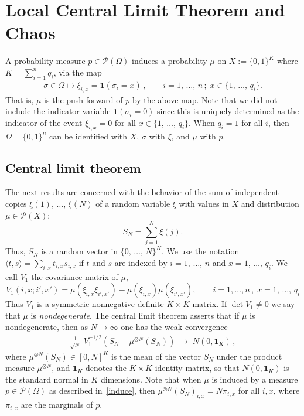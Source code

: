 \documentclass[AHL,Unicode,longabstracts,published]{cedram}
\newcommand{\si}{\sigma}
\newcommand{\scalar}[2]{\langle #1, #2\rangle}
\newcommand{\ind}{\mathbf{1}}
\newcommand{\cP}{\mathcal{P}}
\let\O=\Omega
\begin{document}
\section{Local Central Limit Theorem and Chaos}\label{sec:clt_chaos}

A probability measure $p\in\cP(\O)$ induces a probability $\mu$ on $X:=\{0,1\}^K$ where $K=\sum_{i=1}^n q_{i}$, via the map
\begin{align}\label{induce}
\si\in\O \mapsto \xi_{i,x} = \ind(\si_i=x)\,,\qquad i=1,\,\dots,\,n\,;\; x\in \{1,\,\dots,\,q_i\}.
\end{align}
That is, $\mu$ is the push forward of $p$ by the above map. Note that we did not include the indicator variable $ \ind(\si_i=0)$ since this is uniquely determined as the indicator of the event $\xi_{i,x}=0$ for all $x\in \{1,\,\dots,\,q_i\}$. When $q_i=1$ for all $i$, then $\O=\{0,1\}^n$ can be identified with $X$, $\si$ with $\xi$, and $\mu$ with $p$.


\subsection{Central limit theorem}

The next results are concerned with the behavior of the sum of independent copies $\xi(1),\,\dots,\,\xi(N)$ of a random variable $\xi$ with values in $X$ and distribution $\mu\in\cP(X)$:
\[
S_N = \sum_{j=1}^N\xi(j).
\]
Thus, $S_N$ is a random vector in $\{0,\,\dots,\,N\}^K$. We use the notation $\scalar{t}{s}=\sum_{i,x}t_{i,x}s_{i,x}$ if $t$ and $s$ are indexed by $i=1,\,\dots,\,n$ and $x=1,\,\dots,\,q_i$. We call $V_1$ the covariance matrix of $\mu$,
\[
V_1(i,x;i',x')=\mu(\xi_{i,x}\xi_{i',x'})-\mu(\xi_{i,x})\mu(\xi_{i',x'}),\qquad i=1,\dots,n\,,\; x=1,\,\dots,\,q_i
\]
Thus $V_1$ is a symmetric nonnegative definite $K\times K$ matrix. If $\det V_1\neq 0$ we say that $\mu$ is \emph{nondegenerate}. The central limit theorem asserts that if $\mu $ is nondegenerate, then as $N\to\infty$ one has the weak convergence
\begin{align}\label{eq:CLT}
\frac1{\sqrt N} \;V_1^{-1/2}\left(S_N - \mu^{\otimes N}(S_N)\right)\;
\longrightarrow\; N(0,\ind_K)\,,
\end{align}
where $\mu^{\otimes N}(S_N)\in[0,N]^K$ is the mean of the vector $S_N$ under the product measure $\mu^{\otimes N}$, and $\ind_K$ denotes the $K\times K$ identity matrix, so that $N(0,\ind_K)$ is the standard normal in $K$ dimensions. Note that when $\mu$ is induced by a measure $p\in\cP(\O)$ as described in~\eqref{induce}, then $\mu^{\otimes N}(S_N)_{i,x}=N\pi_{i,x}$ for all $i,x$, where $\pi_{i,x}$ are the marginals of $p$.
\end{document}
